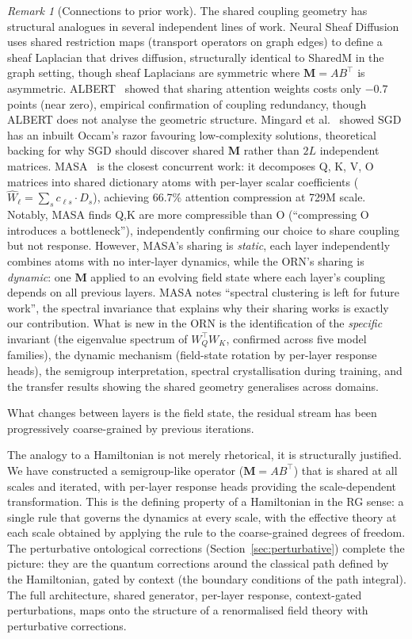 \documentclass[11pt, a4paper]{article}
\newcommand{\M}{\mathbf{M}}
\theoremstyle{remark}
\newtheorem*{remark}{Remark}
\begin{document}
\begin{remark}[Connections to prior work]
The shared coupling geometry has structural analogues in several independent lines of work.
Neural Sheaf Diffusion~\cite{bodnar2022sheaf} uses shared restriction maps (transport operators on graph edges) to define a sheaf Laplacian that drives diffusion, structurally identical to SharedM in the graph setting, though sheaf Laplacians are symmetric where $\M = AB^\top$ is asymmetric.
ALBERT~\cite{lan2020albert} showed that sharing attention weights costs only $-0.7$ points (near zero), empirical confirmation of coupling redundancy, though ALBERT does not analyse the geometric structure.
Mingard et al.~\cite{louis2025occam} showed SGD has an inbuilt Occam's razor favouring low-complexity solutions, theoretical backing for why SGD should discover shared $\M$ rather than $2L$ independent matrices.
MASA~\cite{masa2025} is the closest concurrent work: it decomposes Q, K, V, O matrices into shared dictionary atoms with per-layer scalar coefficients ($\hat{W}_\ell = \sum_s c_{\ell s} \cdot D_s$), achieving 66.7\% attention compression at 729M scale.
Notably, MASA finds Q,K are more compressible than O (``compressing O introduces a bottleneck''), independently confirming our choice to share coupling but not response.
However, MASA's sharing is \emph{static}, each layer independently combines atoms with no inter-layer dynamics, while the ORN's sharing is \emph{dynamic}: one $\M$ applied to an evolving field state where each layer's coupling depends on all previous layers.
MASA notes ``spectral clustering is left for future work'', the spectral invariance that explains why their sharing works is exactly our contribution.
What is new in the ORN is the identification of the \emph{specific} invariant (the eigenvalue spectrum of $W_Q^\top W_K$, confirmed across five model families), the dynamic mechanism (field-state rotation by per-layer response heads), the semigroup interpretation, spectral crystallisation during training, and the transfer results showing the shared geometry generalises across domains.
\end{remark}
What changes between layers is the field state, the residual stream has been progressively coarse-grained by previous iterations.

The analogy to a Hamiltonian is not merely rhetorical, it is structurally justified.
We have constructed a semigroup-like operator ($\M = AB^\top$) that is shared at all scales and iterated, with per-layer response heads providing the scale-dependent transformation.
This is the defining property of a Hamiltonian in the RG sense: a single rule that governs the dynamics at every scale, with the effective theory at each scale obtained by applying the rule to the coarse-grained degrees of freedom.
The perturbative ontological corrections (Section~\ref{sec:perturbative}) complete the picture: they are the quantum corrections around the classical path defined by the Hamiltonian, gated by context (the boundary conditions of the path integral).
The full architecture, shared generator, per-layer response, context-gated perturbations, maps onto the structure of a renormalised field theory with perturbative corrections.
\end{document}
